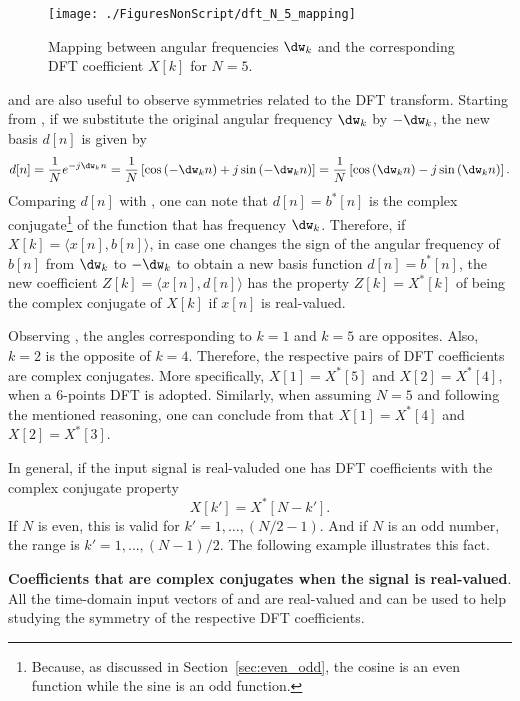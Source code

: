 \begin{figure}[htbp]
\centering
\texttt{[image: ./FiguresNonScript/dft\_N\_5\_mapping]}
\caption{Mapping between angular frequencies $\dw_k$ and the corresponding DFT coefficient $X[k]$ for $N=5$.\label{fig:dft_N_5_mapping}}
\end{figure}

 and  are also useful to observe symmetries related to the DFT transform.
Starting from , if we substitute the original angular frequency $\dw_k$ by $-\dw_k$, the new
basis $d[n]$ is given by
\begin{equation}
d[n] = \frac{1}{N} e^{-j \dw_k n} = \frac{1}{N} \left[ \cos \left(-\dw_k n \right) + j \sin \left(-\dw_k n \right) \right] =
\frac{1}{N} \left[ \cos \left(\dw_k n \right) - j \sin \left(\dw_k n \right) \right].
\end{equation}
Comparing $d[n]$ with , one can note that $d[n]=b^*[n]$ is the complex conjugate\footnote{Because, as discussed in Section~\ref{sec:even_odd}, the cosine is an even function while the sine is an odd function.} of the function that has frequency $\dw_k$. 
Therefore, if $X[k]=\langle x[n], b[n] \rangle$, in case one changes the sign of the angular frequency of $b[n]$ from
$\dw_k$ to $-\dw_k$ to obtain a new basis function $d[n]=b^*[n]$, the new coefficient $Z[k]=\langle x[n], d[n] \rangle$
has the property $Z[k] = X^*[k]$ of being the complex conjugate of $X[k]$ if $x[n]$ is real-valued.

Observing , the angles corresponding to $k=1$ and $k=5$ are opposites. Also, $k=2$ is the opposite of $k=4$.
Therefore, the respective pairs of DFT coefficients are complex conjugates. More specifically, $X[1] = X^*[5]$ and $X[2] = X^*[4]$, when a 6-points DFT is adopted.
Similarly, when assuming $N=5$ and following the mentioned reasoning, one can conclude from   that 
$X[1] = X^*[4]$ and $X[2] = X^*[3]$.

In general, if the input signal is real-valuded one has DFT coefficients with the complex conjugate property
\[
X[k'] = X^*[N-k'].
\]
If $N$ is even, this is valid for $k'=1, \ldots, (N/2-1)$. And if $N$ is an odd number, 
the range is $k'=1, \ldots, (N-1)/2$. The following example illustrates this fact.

\bExample \textbf{Coefficients that are complex conjugates when the signal is real-valued}.
\label{ex:symmetry_dft_real}
All the time-domain input vectors of  and  are real-valued and
can be used to help studying the symmetry of the respective DFT coefficients.

